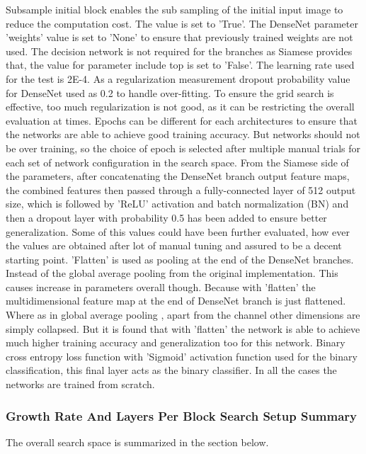  Subsample initial block enables the sub sampling of the initial input image to reduce the computation cost. The value is set to 'True'. The DenseNet parameter 'weights' value is set to 'None' to ensure that previously 
 trained weights are not used. The decision network is not required for the branches as Siamese provides that, the value for parameter include top is set to 'False'.
 The learning rate used for the test is 2E-4. As a regularization measurement dropout probability value for DenseNet used as 0.2 to handle over-fitting. To ensure the grid search is effective, too much regularization is not good, 
 as it can be restricting the overall evaluation at times. Epochs can be different for each architectures to ensure that the networks are able to achieve good training accuracy. But networks should not be over training, so the 
 choice of epoch is selected after multiple manual trials for each set of network configuration in the search space. From the Siamese side of the parameters, after concatenating the DenseNet branch output feature maps, 
 the combined features then passed through a fully-connected layer of 512 output size, which is followed by 'ReLU' activation and batch normalization (BN) and then a dropout layer with probability 0.5 has been added to ensure better 
 generalization. 
 Some of this values could have been further evaluated, how ever the values are obtained after lot of manual tuning and assured to be a decent starting point. 'Flatten' is used as pooling at the end of the DenseNet branches. Instead
 of the global average pooling from the original implementation. This causes increase in parameters overall though. Because with 'flatten' the multidimensional feature map at the end of DenseNet branch is just flattened. Where as in
 global average pooling \cite{lin2013network}, apart from the channel other dimensions are simply collapsed. But it is found that with 'flatten' the network is able to achieve much higher training accuracy and generalization too for 
 this network. Binary cross entropy loss function with 'Sigmoid' activation function used for the binary classification, this final layer acts as the binary classifier. In all the cases the networks are trained from scratch. 

\subsubsection{Growth Rate And Layers Per Block Search Setup Summary}
The overall search space is summarized in the section below.
